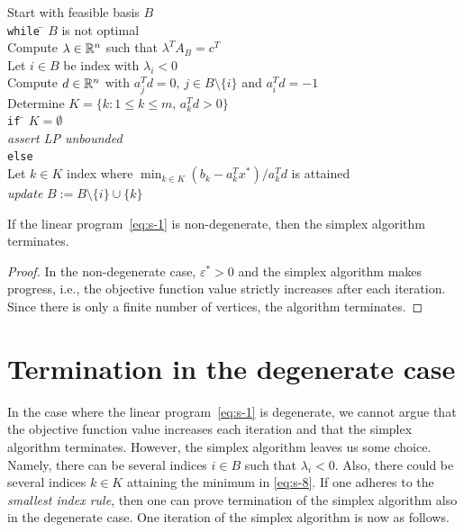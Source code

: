 \begin{algorithm}
 \begin{tabbing}
      Start with feasible basis $B$ \\[1ex]
      {\tt while} \= $B$ is not optimal \\ [.7ex]
      \> Compute $\lambda \in \mathbb{R}^n$ such that $\lambda^TA_B = c^T$ \\
      \> Let $i \in B$ be index with $\lambda_i<0$ \\
      \> Compute  $d \in \mathbb{R}^n$ with $a_j^T d = 0, \, j \in B \setminus\{i\}$
      and $a_i^T d = -1$ \\ 
      \> Determine $K = \{ k \colon 1 \leq k \leq m, \, a_k^Td >0\}$\\[.7ex]  
      \> {\tt if} \= $K = \emptyset$ \\   
      \> \> \emph{assert LP unbounded} \\
      \> {\tt else} \\
      \> \> Let $k \in K$ index where 
     $
        \displaystyle \min_{k \in K} (b_k - a_k^Tx^*)/a_k^Td
      $
      is attained \\

      \> \>\emph{update} $B := B \setminus\{i\} \cup \{k\}$             
    \end{tabbing}
    
  \end{algorithm}
  


  \begin{theorem}
    \label{thr:s-5}
    If the linear program~\eqref{eq:s-1} is non-degenerate, then the simplex algorithm terminates. 
  \end{theorem}

  \begin{proof}
    In the non-degenerate case, $\varepsilon^*>0$ and the simplex
    algorithm makes progress, i.e., the objective function value
    strictly increases after each iteration. Since there is only a
    finite number of vertices, the algorithm terminates.
  \end{proof}

  
\section{Termination in the degenerate case}
\label{sec:term-degen-case}


In the case where the linear program~\eqref{eq:s-1} is degenerate, we cannot argue that the objective function value increases each iteration and that the simplex algorithm terminates. However, the simplex algorithm leaves us some choice. Namely, there can be several indices $i \in B$ such that $\lambda_i<0$. Also, there could be several indices $k \in K$ attaining the minimum in \eqref{eq:s-8}. If one adheres to the  \emph{smallest index rule}, then one can prove termination of the simplex algorithm also in the degenerate case. One iteration of the simplex algorithm is now as follows. 



